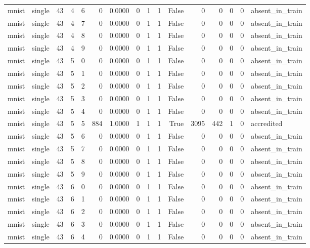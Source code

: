 \begin{tabular}{llrrrrrrrrrrrrrl}
mnist & single & 43 & 4 & 6 & 0 & 0.0000 & 0 & 1 & 1 & False & 0 & 0 & 0 & 0 & absent\_in\_train \\
mnist & single & 43 & 4 & 7 & 0 & 0.0000 & 0 & 1 & 1 & False & 0 & 0 & 0 & 0 & absent\_in\_train \\
mnist & single & 43 & 4 & 8 & 0 & 0.0000 & 0 & 1 & 1 & False & 0 & 0 & 0 & 0 & absent\_in\_train \\
mnist & single & 43 & 4 & 9 & 0 & 0.0000 & 0 & 1 & 1 & False & 0 & 0 & 0 & 0 & absent\_in\_train \\
mnist & single & 43 & 5 & 0 & 0 & 0.0000 & 0 & 1 & 1 & False & 0 & 0 & 0 & 0 & absent\_in\_train \\
mnist & single & 43 & 5 & 1 & 0 & 0.0000 & 0 & 1 & 1 & False & 0 & 0 & 0 & 0 & absent\_in\_train \\
mnist & single & 43 & 5 & 2 & 0 & 0.0000 & 0 & 1 & 1 & False & 0 & 0 & 0 & 0 & absent\_in\_train \\
mnist & single & 43 & 5 & 3 & 0 & 0.0000 & 0 & 1 & 1 & False & 0 & 0 & 0 & 0 & absent\_in\_train \\
mnist & single & 43 & 5 & 4 & 0 & 0.0000 & 0 & 1 & 1 & False & 0 & 0 & 0 & 0 & absent\_in\_train \\
mnist & single & 43 & 5 & 5 & 884 & 1.0000 & 1 & 1 & 1 & True & 3095 & 442 & 1 & 0 & accredited \\
mnist & single & 43 & 5 & 6 & 0 & 0.0000 & 0 & 1 & 1 & False & 0 & 0 & 0 & 0 & absent\_in\_train \\
mnist & single & 43 & 5 & 7 & 0 & 0.0000 & 0 & 1 & 1 & False & 0 & 0 & 0 & 0 & absent\_in\_train \\
mnist & single & 43 & 5 & 8 & 0 & 0.0000 & 0 & 1 & 1 & False & 0 & 0 & 0 & 0 & absent\_in\_train \\
mnist & single & 43 & 5 & 9 & 0 & 0.0000 & 0 & 1 & 1 & False & 0 & 0 & 0 & 0 & absent\_in\_train \\
mnist & single & 43 & 6 & 0 & 0 & 0.0000 & 0 & 1 & 1 & False & 0 & 0 & 0 & 0 & absent\_in\_train \\
mnist & single & 43 & 6 & 1 & 0 & 0.0000 & 0 & 1 & 1 & False & 0 & 0 & 0 & 0 & absent\_in\_train \\
mnist & single & 43 & 6 & 2 & 0 & 0.0000 & 0 & 1 & 1 & False & 0 & 0 & 0 & 0 & absent\_in\_train \\
mnist & single & 43 & 6 & 3 & 0 & 0.0000 & 0 & 1 & 1 & False & 0 & 0 & 0 & 0 & absent\_in\_train \\
mnist & single & 43 & 6 & 4 & 0 & 0.0000 & 0 & 1 & 1 & False & 0 & 0 & 0 & 0 & absent\_in\_train \\

\end{tabular}

